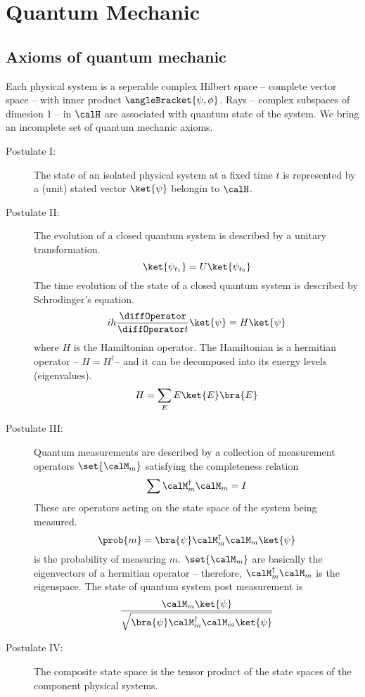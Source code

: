 \chapter{Quantum Mechanic}
\section{Axioms of quantum mechanic}
Each physical system is a seperable complex Hilbert space -- complete vector space -- with inner product \(\angleBracket{\psi,\phi}\). Rays -- complex subspaces of dimesion 1 -- in \(\calH\) are associated with quantum state of the system. We bring an incomplete set of quantum mechanic axioms.

\begin{description}
    \item [Postulate I:] The state of an isolated physical system at a fixed time \(t\) is represented by a (unit) stated vector \(\ket{\psi}\) belongin to \(\calH\).
    \item [Postulate II:] The evolution of a closed quantum system is described by a unitary transformation.
    \begin{equation*}
        \ket{\psi_{t_1}} = U \ket{\psi_{t_0}}
    \end{equation*}
    The time evolution of the state of a closed quantum system is described by Schrodinger's equation.
    \begin{equation*}
        ih \dfrac{\diffOperator}{\diffOperator t} \ket{\psi} = H \ket{\psi}
    \end{equation*}
    where \(H\) is the Hamiltonian operator. The Hamiltonian is a hermitian operator -- \(H = H^{\dagger}\)-- and it can be decomposed into its energy levels (eigenvalues).
    \begin{equation*}
        H = \sum_{E} E \ket{E} \bra{E}
    \end{equation*}

    \item [Postulate III:] Quantum measurements are described by a collection  of measurement operators \(\set{\calM_m}\) satisfying the completeness relation
    \begin{equation*}
        \sum \calM_m^{\dagger} \calM_m = I
    \end{equation*}
    These are operators acting on the state space of the system being measured.
    \begin{equation*}
        \prob{m} = \bra{\psi} \calM_m^{\dagger} \calM_m \ket{\psi}
    \end{equation*} 
    is the probability of measuring \(m\). \(\set{\calM_m}\) are basically the eigenvectors of a hermitian operator -- therefore, \(\calM_m^{\dagger} \calM_m \) is the eigenspace. The state of quantum system post measurement is 
    \begin{equation*}
        \dfrac{\calM_m \ket{\psi}}{\sqrt{\bra{\psi} \calM_m^{\dagger} \calM_m \ket{\psi}}}
    \end{equation*}
    \item [Postulate IV:] The composite state space is the tensor product of the state spaces of the component physical  systems.
\end{description}

